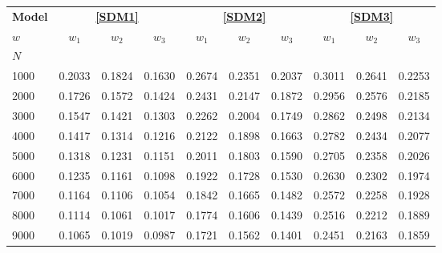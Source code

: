 \begin{tabular*}{\textwidth}{@{\extracolsep\fill}lccccccccc@{}}
\toprule
\textbf{Model} & \multicolumn{3}{c}{\textbf{\eqref{SDM1}}} & \multicolumn{3}{c}{\textbf{\eqref{SDM2}}} & \multicolumn{3}{c}{\textbf{\eqref{SDM3}}} \\
\cmidrule{2-4} \cmidrule{5-7} \cmidrule{8-10}
\textbf{$w$} & \textbf{$w_1$} & \textbf{$w_2$} & \textbf{$w_3$} & \textbf{$w_1$} & \textbf{$w_2$} & \textbf{$w_3$} & \textbf{$w_1$} & \textbf{$w_2$} & \textbf{$w_3$} \\
\midrule
$N$ & & & & & & & & & \\
1000 & 0.2033 & 0.1824 & 0.1630 & 0.2674 & 0.2351 & 0.2037 & 0.3011 & 0.2641 & 0.2253 \\
2000 & 0.1726 & 0.1572 & 0.1424 & 0.2431 & 0.2147 & 0.1872 & 0.2956 & 0.2576 & 0.2185 \\
3000 & 0.1547 & 0.1421 & 0.1303 & 0.2262 & 0.2004 & 0.1749 & 0.2862 & 0.2498 & 0.2134 \\
4000 & 0.1417 & 0.1314 & 0.1216 & 0.2122 & 0.1898 & 0.1663 & 0.2782 & 0.2434 & 0.2077 \\
5000 & 0.1318 & 0.1231 & 0.1151 & 0.2011 & 0.1803 & 0.1590 & 0.2705 & 0.2358 & 0.2026 \\
6000 & 0.1235 & 0.1161 & 0.1098 & 0.1922 & 0.1728 & 0.1530 & 0.2630 & 0.2302 & 0.1974 \\
7000 & 0.1164 & 0.1106 & 0.1054 & 0.1842 & 0.1665 & 0.1482 & 0.2572 & 0.2258 & 0.1928 \\
8000 & 0.1114 & 0.1061 & 0.1017 & 0.1774 & 0.1606 & 0.1439 & 0.2516 & 0.2212 & 0.1889 \\
9000 & 0.1065 & 0.1019 & 0.0987 & 0.1721 & 0.1562 & 0.1401 & 0.2451 & 0.2163 & 0.1859 \\
\bottomrule
\end{tabular*}
